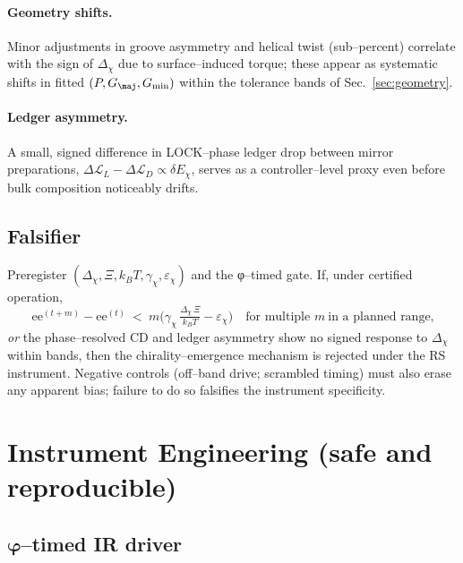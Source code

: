 \documentclass[11pt]{article}
\begin{document}
\paragraph{Geometry shifts.}
Minor adjustments in groove asymmetry and helical twist (sub–percent) correlate with the sign of $\Delta_{\chi}$ due to surface–induced torque; these appear as systematic shifts in fitted $(P,G_{\maj},G_{\min})$ within the tolerance bands of Sec.~\ref{sec:geometry}.

\paragraph{Ledger asymmetry.}
A small, signed difference in LOCK–phase ledger drop between mirror preparations,
\(
\Delta\mathcal{L}_L-\Delta\mathcal{L}_D \propto \delta E_\chi
\),
serves as a controller–level proxy even before bulk composition noticeably drifts.

\subsection{Falsifier}\label{sec:chi-falsifier}
Preregister $(\Delta_{\chi},\Xi,k_BT,\gamma_\chi,\varepsilon_\chi)$ and the φ–timed gate. If, under certified operation,
\[
\mathrm{ee}^{(t+m)}-\mathrm{ee}^{(t)}\ <\ m\Big(\gamma_\chi\,\tfrac{\Delta_{\chi}\,\Xi}{k_BT}-\varepsilon_\chi\Big)
\quad \text{for multiple }m\ \text{in a planned range,}
\]
\emph{or} the phase–resolved CD and ledger asymmetry show no signed response to $\Delta_{\chi}$ within bands, then the chirality–emergence mechanism is rejected under the RS instrument. Negative controls (off–band drive; scrambled timing) must also erase any apparent bias; failure to do so falsifies the instrument specificity.

\section{Instrument Engineering (safe and reproducible)}\label{sec:engineering}

\subsection{$\boldsymbol{\varphi}$--timed IR driver}\label{sec:driver}
\end{document}
